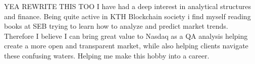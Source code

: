 \documentclass[../../main.tex]{subfiles}
\begin{document}
YEA REWRITE THIS TOO
I have had a deep interest in analytical structures and finance. Being quite active in KTH Blockchain society i find myself reading books at SEB trying to learn how to analyze and predict market trends. Therefore I believe I can bring great value to Nasdaq as a QA analysis helping create a more open and transparent market, while also helping clients navigate these confusing waters. Helping me make this hobby into a career.
\\
\end{document}

